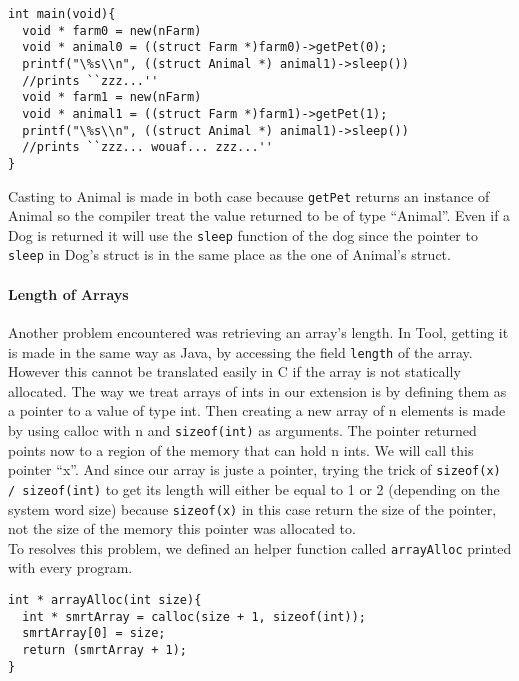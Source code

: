 \lstset{style=customc}
\begin{lstlisting}
int main(void){
  void * farm0 = new(nFarm)
  void * animal0 = ((struct Farm *)farm0)->getPet(0);
  printf("\%s\\n", ((struct Animal *) animal1)->sleep())
  //prints ``zzz...''
  void * farm1 = new(nFarm)
  void * animal1 = ((struct Farm *)farm1)->getPet(1);
  printf("\%s\\n", ((struct Animal *) animal1)->sleep())
  //prints ``zzz... wouaf... zzz...''
}
\end{lstlisting}

Casting to Animal is made in both case because {\lstinline[basicstyle=\small\ttfamily]|getPet|} returns an instance of Animal so the compiler treat the value returned to be of type ``Animal''. Even if a Dog is returned it will use the {\lstinline[basicstyle=\small\ttfamily]|sleep|} function of the dog since the pointer to {\lstinline[basicstyle=\small\ttfamily]|sleep|} in Dog's struct is in the same place as the one of Animal's struct.

\paragraph{Length of Arrays}
Another problem encountered was retrieving an array's length. In Tool, getting it is made in the same way as Java, by accessing the field {\lstinline[basicstyle=\small\ttfamily]|length|} of the array. However this cannot be translated easily in C if the array is not statically allocated. The way we treat arrays of ints in our extension is by defining them as a pointer to a value of type int. Then creating a new array of n elements is made by using calloc with n and {\lstinline[basicstyle=\small\ttfamily]|sizeof(int)|} as arguments. The pointer returned points now to a region of the memory that can hold n ints. We will call this pointer ``x''. And since our array is juste a pointer, trying the trick of {\lstinline[basicstyle=\small\ttfamily]|sizeof(x) / sizeof(int)|} to get its length will either be equal to 1 or 2 (depending on the system word size) because {\lstinline[basicstyle=\small\ttfamily]|sizeof(x)|} in this case return the size of the pointer, not the size of the memory this pointer was allocated to.\\
To resolves this problem, we defined an helper function called {\lstinline[basicstyle=\small\ttfamily]|arrayAlloc|} printed with every program.

\begin{lstlisting}
int * arrayAlloc(int size){
  int * smrtArray = calloc(size + 1, sizeof(int));
  smrtArray[0] = size;
  return (smrtArray + 1);
}
\end{lstlisting}

